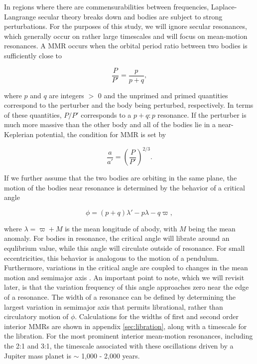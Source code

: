 In regions where there are commensurabilities between frequencies, Laplace-Langrange secular theory breaks down and bodies 
are subject to strong perturbations. For the purposes of this study, we will ignore secular resonances, which generally occur on 
rather large timescales and will focus on mean-motion resonances. A MMR occurs  when the orbital period ratio between two 
bodies is sufficiently close to

\begin{equation}\label{eq:per_mmr}
	\frac{P}{P'} = \frac{p}{p + q},
\end{equation}

\noindent where  $p$ and $q$ are integers $>$ 0 and the unprimed and primed quantities correspond to the perturber and the 
body being perturbed, respectively. In terms of these quantities, $P/P'$ corresponds to a $p+q:p$ resonance. If the perturber is 
much more massive than the other body and all of the bodies lie in a near-Keplerian potential, the condition for MMR is set by

\begin{equation}\label{eq:a_mmr}
	\frac{a}{a'} = \left( \frac{P}{P'} \right)^{2/3}.
\end{equation}

If we further assume that the two bodies are orbiting in the same plane, the motion of the bodies near resonance is determined 
by the behavior of a critical angle

\begin{equation}\label{eq:phi_crit}
	\phi = (p + q) \lambda' - p \lambda - q \varpi,
\end{equation}

\noindent where $\lambda = \varpi + M$ is the mean longitude of abody, with $M$ being the mean anomaly. For bodies in 
resonance, the critical angle will librate around an equlibrium value, while this angle will circulate outside of resonance. For small 
eccentricities, this behavior is analogous to the motion of a pendulum. Furthermore, variations in the critical angle are coupled to 
changes in the mean motion and semimajor axis \cite{murray99}. An important point to note, which we will revisit later, is that the 
variation frequency of this angle approaches zero near the edge of a resonance. The width of a resonance can be defined by 
determining the largest variation in semimajor axis that permits librational, rather than circulatory motion of $\phi$. Calculations 
for the widths of first and second order interior MMRs are shown in appendix \ref{sec:libration}, along with a timescale for the 
libration. For the most prominent interior mean-motion resonances, including the 2:1 and 3:1, the timescale associated with 
these oscillations driven by a Jupiter mass planet is  $\sim$ 1,000 - 2,000 years.

